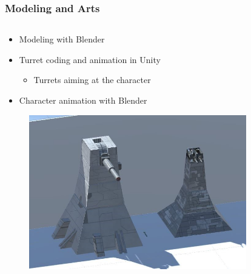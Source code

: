 \documentclass[xcolor=dvipsnames]{beamer}
\begin{document}
	\begin{frame}
		\frametitle{Modeling and Arts}
		\begin{columns}[T]
			\begin{column}{0.7\textwidth}
				\begin{itemize}
					\item Modeling with Blender
					\item Turret coding and animation in Unity
					\begin{itemize}
						\item Turrets aiming at the character
					\end{itemize}
					\item Character animation with Blender
				\end{itemize}
				\begin{figure}[ht]
					\includegraphics[scale=0.35]{images/interim/turrets}
				\end{figure}
			\end{column}
			\begin{column}{0.3\textwidth}
				\begin{figure}[ht]

\end{figure}
\end{column}
\end{columns}
\end{frame}
\end{document}
